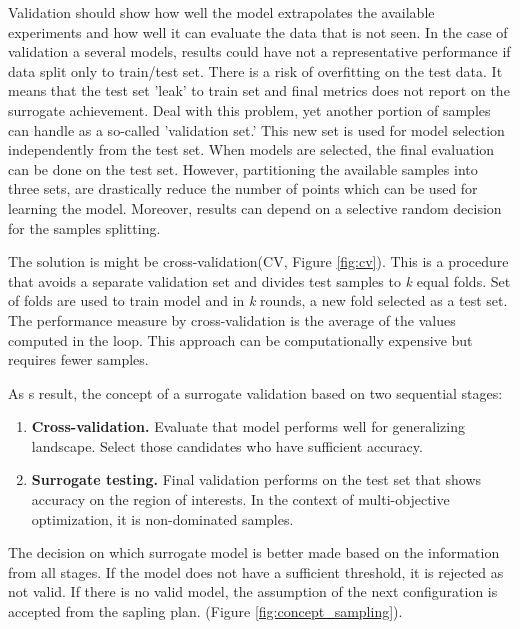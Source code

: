         Validation should show how well the model extrapolates the available experiments and how well it can evaluate the data that is not seen. In the case of validation a several models, results could have not a representative performance if data split only to train/test set.  There is a risk of overfitting on the test data. It means that the test set 'leak' to train set and final metrics does not report on the surrogate achievement. 
        Deal with this problem, yet another portion of samples can handle as a so-called 'validation set.' This new set is used for model selection independently from the test set. When models are selected, the final evaluation can be done on the test set. However, partitioning the available samples into three sets, are drastically reduce the number of points which can be used for learning the model. Moreover, results can depend on a selective random decision for the samples splitting.
        
        The solution is might be cross-validation(CV, Figure \ref{fig:cv}). This is a procedure that avoids a separate validation set and divides test samples to \textit{k} equal folds. Set of folds are used to train model and in \textit{k} rounds, a new fold selected as a test set. The performance measure by cross-validation is the average of the values computed in the loop. This approach can be computationally expensive but requires fewer samples. 
        
        As s result, the concept of a surrogate validation based on two sequential stages:
        \begin{enumerate}
            \item \textbf{Cross-validation.} Evaluate that model performs well for generalizing landscape. Select those candidates who have sufficient accuracy.
            \item \textbf{Surrogate testing.} Final validation performs on the test set that shows accuracy on the region of interests. In the context of multi-objective optimization, it is non-dominated samples.
        \end{enumerate}
        
        The decision on which surrogate model is better made based on the information from all stages. If the model does not have a sufficient threshold, it is rejected as not valid. If there is no valid model, the assumption of the next configuration is accepted from the sapling plan. (Figure \ref{fig:concept_sampling}).

    
